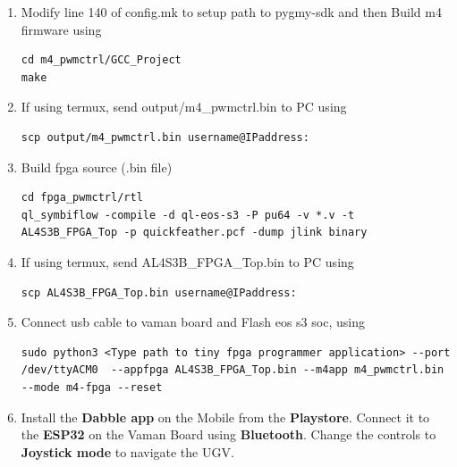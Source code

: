 \begin{enumerate}[label=\thesection.\arabic*.,ref=\thesection.\theenumi]
\item  Modify line 140 of config.mk to setup path to pygmy-sdk and then Build m4 firmware using
\begin{lstlisting}
cd m4_pwmctrl/GCC_Project
make
\end{lstlisting}

\item If using termux, send output/m4{\_}pwmctrl.bin to PC using
\begin{lstlisting}
scp output/m4_pwmctrl.bin username@IPaddress:
\end{lstlisting} 

\item Build fpga source (.bin file)
\begin{lstlisting}
cd fpga_pwmctrl/rtl
ql_symbiflow -compile -d ql-eos-s3 -P pu64 -v *.v -t AL4S3B_FPGA_Top -p quickfeather.pcf -dump jlink binary 
\end{lstlisting} 

\item If using termux, send AL4S3B{\_}FPGA{\_}Top.bin to PC using
\begin{lstlisting}
scp AL4S3B_FPGA_Top.bin username@IPaddress:
\end{lstlisting} 

\item Connect usb cable to vaman board and Flash eos s3 soc, using
\begin{lstlisting}
sudo python3 <Type path to tiny fpga programmer application> --port /dev/ttyACM0  --appfpga AL4S3B_FPGA_Top.bin --m4app m4_pwmctrl.bin --mode m4-fpga --reset
\end{lstlisting} 

\item Install the \textbf{Dabble app} on the Mobile from the \textbf{Playstore}. Connect it to the \textbf{ESP32} on the Vaman Board using \textbf{Bluetooth}. Change the controls to \textbf{Joystick mode} to navigate the UGV.\\


\end{enumerate}
